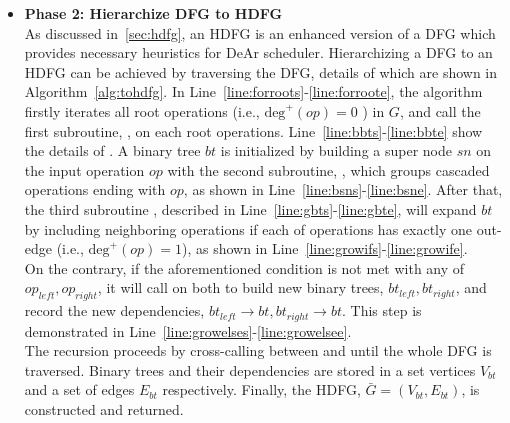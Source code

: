\begin{itemize}
            \item \textbf{Phase 2: Hierarchize DFG to HDFG} \\\indent
                As discussed in~\ref{sec:hdfg}, an HDFG is an enhanced version of a DFG which provides necessary heuristics for DeAr scheduler.
                Hierarchizing a DFG to an HDFG can be achieved by traversing the DFG, details of which are shown in Algorithm~\ref{alg:tohdfg}.
                In Line~\ref{line:forroots}-\ref{line:forroote}, the algorithm firstly iterates all root operations (i.e., $\textrm{deg}^+(op)=0$ ) in $G$,
                and call the first subroutine, , on each root operations.
                Line~\ref{line:bbts}-\ref{line:bbte} show the details of .
                A binary tree $bt$ is initialized by building a super node $sn$ on the input operation $op$ with the second subroutine, , 
                which groups cascaded operations ending with $op$, as shown in Line~\ref{line:bsns}-\ref{line:bsne}.
                After that, the third subroutine , described in Line~\ref{line:gbts}-\ref{line:gbte}, will expand $bt$ by including neighboring operations if each of operations has exactly one out-edge (i.e., $\textrm{deg}^+(op)=1$), as shown in Line~\ref{line:growifs}-\ref{line:growife}. 
                \\\indent
                On the contrary, if the aforementioned condition is not met with any of $op_{left}, op_{right}$, 
                it will call  on both to build new binary trees, $bt_{left}, bt_{right}$,
                and record the new dependencies, $bt_{left} \rightarrow bt, bt_{right} \rightarrow bt$.
                This step is demonstrated in Line~\ref{line:growelses}-\ref{line:growelsee}. 
                \\\indent
                The recursion proceeds by cross-calling between  and  until the whole DFG is traversed.
                Binary trees and their dependencies are stored in a set vertices $V_{bt}$ and a set of edges $E_{bt}$ respectively.
                Finally, the HDFG, $\bar{G} = ( V_{bt} , E_{bt} )$, is constructed and returned.
        \end{itemize}


